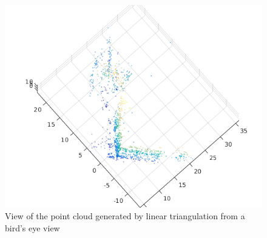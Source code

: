 \documentclass{article}
\begin{document}
\begin{figure}[!h]
\includegraphics[width = \textwidth]{lin_tri_top.png}
\centering
\caption{View of the point cloud generated by linear triangulation from a bird's eye view}
\end{figure}

\FloatBarrier
\end{document}
